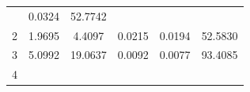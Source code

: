 \documentclass[11pt,]{article}
\begin{document}
\begin{longtable}[]{@{}cccccc@{}}
\begin{minipage}[t]{0.11\columnwidth}
\end{minipage} & \begin{minipage}[t]{0.14\columnwidth}\centering\strut
0.0324\strut
\end{minipage} & \begin{minipage}[t]{0.13\columnwidth}\centering\strut
52.7742\strut
\end{minipage}\tabularnewline
\begin{minipage}[t]{0.08\columnwidth}\centering\strut
2\strut
\end{minipage} & \begin{minipage}[t]{0.11\columnwidth}\centering\strut
1.9695\strut
\end{minipage} & \begin{minipage}[t]{0.26\columnwidth}\centering\strut
4.4097\strut
\end{minipage} & \begin{minipage}[t]{0.11\columnwidth}\centering\strut
0.0215\strut
\end{minipage} & \begin{minipage}[t]{0.14\columnwidth}\centering\strut
0.0194\strut
\end{minipage} & \begin{minipage}[t]{0.13\columnwidth}\centering\strut
52.5830\strut
\end{minipage}\tabularnewline
\begin{minipage}[t]{0.08\columnwidth}\centering\strut
3\strut
\end{minipage} & \begin{minipage}[t]{0.11\columnwidth}\centering\strut
5.0992\strut
\end{minipage} & \begin{minipage}[t]{0.26\columnwidth}\centering\strut
19.0637\strut
\end{minipage} & \begin{minipage}[t]{0.11\columnwidth}\centering\strut
0.0092\strut
\end{minipage} & \begin{minipage}[t]{0.14\columnwidth}\centering\strut
0.0077\strut
\end{minipage} & \begin{minipage}[t]{0.13\columnwidth}\centering\strut
93.4085\strut
\end{minipage}\tabularnewline
\begin{minipage}[t]{0.08\columnwidth}\centering\strut
4\strut
\end{minipage} & \begin{minipage}[t]{0.11\columnwidth}\centering\strut

\end{minipage}
\end{longtable}
\end{document}
